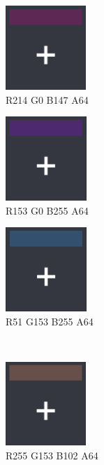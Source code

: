 \begin{figure}[h] 
\centering
\begin{subfigure}{0.22\textwidth}
\includegraphics[scale=1]{player1disabledpanel}
\caption*{\hspace*{-0.35cm}R214 G0 B147 A64}
\end{subfigure}
\begin{subfigure}{0.22\textwidth}
\includegraphics[scale=1]{player2disabledpanel}
\caption*{\hspace*{-0.35cm}R153 G0 B255 A64}
\end{subfigure}
\begin{subfigure}{0.22\textwidth}
\includegraphics[scale=1]{player3disabledpanel}
\caption*{\hspace*{-0.35cm}R51 G153 B255 A64}
\end{subfigure} \\
\begin{subfigure}{0.22\textwidth}
\includegraphics[scale=1]{player4disabledpanel}
\caption*{\hspace*{-0.351cm}R255 G153 B102 A64}
\end{subfigure}
\begin{subfigure}{0.22\textwidth}

\end{subfigure}
\end{figure}
